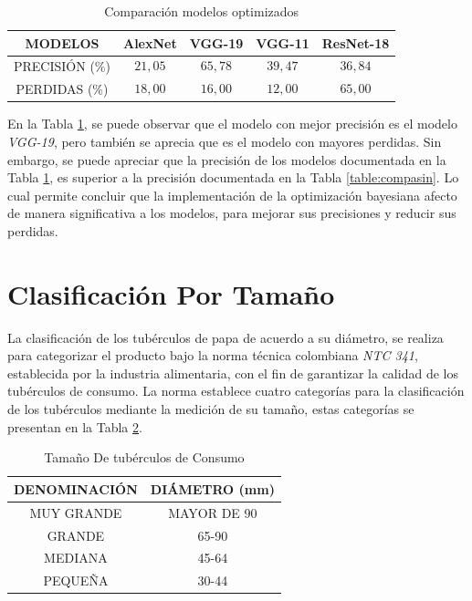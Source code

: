 \begin{table}[ht]
	\centering
	\begin{tabular}{|c|c|c|c|c|}
		\hline
		MODELOS & AlexNet & VGG-19 & VGG-11 & ResNet-18 \\
		\hline
		PRECISIÓN (\%) & $$21,05$$ & $$65,78$$ & $$39,47$$ & $$36,84$$ \\
		\hline
		PERDIDAS (\%) & $$18,00$$ & $$16,00$$ & $$12,00$$ & $$65,00$$ \\
		\hline
	\end{tabular}	
	\caption{Comparación modelos optimizados}
	\label{table:compacon}
\end{table}	

En la Tabla \ref{table:compacon}, se puede observar que el modelo con mejor precisión es el modelo \textit{VGG-19}, pero también se aprecia que es el modelo con mayores perdidas. Sin embargo, se puede apreciar que la precisión de los modelos documentada en la Tabla \ref{table:compacon}, es superior a la precisión documentada en la Tabla \ref{table:compasin}. Lo cual permite concluir que la implementación de la optimización bayesiana afecto de manera significativa a los modelos, para mejorar sus precisiones y reducir sus perdidas.


\newpage		
\section{Clasificación Por Tamaño}

La clasificación de los tubérculos de papa de acuerdo a su diámetro, se realiza para categorizar el producto bajo la norma técnica colombiana \textit{NTC 341}, establecida por la industria alimentaria, con el fin de garantizar la calidad de los tubérculos de consumo. 	La norma establece cuatro categorías para la clasificación de los tubérculos mediante la medición de su tamaño, estas categorías se presentan en la Tabla \ref{table:limites}.

\begin{table}[ht]
	\centering
	\begin{tabular}{|c|c|}
		\hline
		DENOMINACIÓN & DIÁMETRO (mm) \\
		\hline
		MUY GRANDE & MAYOR DE 90 \\
		\hline
		GRANDE & 65-90 \\
		\hline
		MEDIANA	& 45-64 \\
		\hline
		PEQUEÑA & 30-44 \\
		\hline
	\end{tabular}	
	\caption{Tamaño De tubérculos de Consumo}
	\label{table:limites}
\end{table}	

